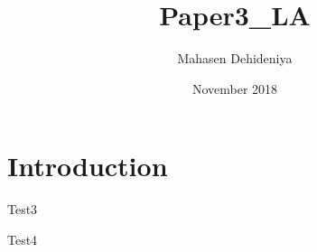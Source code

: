 \documentclass{article}
\title{Paper3_LA}
\author{Mahasen Dehideniya}
\date{November 2018}
\begin{document}
\maketitle

\section{Introduction}
Test3

Test4
\end{document}
